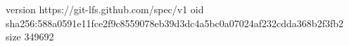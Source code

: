 version https://git-lfs.github.com/spec/v1
oid sha256:588a0591e11fce2f9c8559078eb39d3dc4a5bc0a07024af232cdda368b2f3fb2
size 349692

